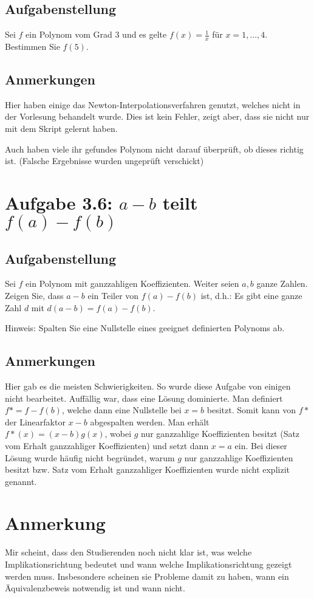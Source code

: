 \documentclass[a4paper]{article}
\begin{document}
\subsection{Aufgabenstellung}

Sei $f$ ein Polynom vom Grad 3 und es gelte $f(x)=\frac 1x$ für $x=1,\ldots,4$. Bestimmen Sie $f(5)$.

\subsection{Anmerkungen}

Hier haben einige das Newton-Interpolationsverfahren genutzt, welches nicht in der Vorlesung behandelt wurde. Dies ist kein Fehler, zeigt aber, dass sie nicht nur mit dem Skript gelernt haben.

Auch haben viele ihr gefundes Polynom nicht darauf überprüft, ob dieses richtig ist. (Falsche Ergebnisse wurden ungeprüft verschickt)

\section{Aufgabe 3.6: $a-b$ teilt $f(a)-f(b)$}

\subsection{Aufgabenstellung}

Sei $f$ ein Polynom mit ganzzahligen Koeffizienten. Weiter seien $a,b$ ganze Zahlen. Zeigen Sie, dass $a-b$ ein Teiler von $f(a)-f(b)$ ist, d.h.: Es gibt eine ganze Zahl $d$ mit $d(a-b)=f(a)-f(b)$.

Hinweis: Spalten Sie eine Nullstelle eines geeignet definierten Polynoms ab.

\subsection{Anmerkungen}

Hier gab es die meisten Schwierigkeiten. So wurde diese Aufgabe von einigen nicht bearbeitet. Auffällig war, dass eine Lösung dominierte. Man definiert $f* = f - f(b)$, welche dann eine Nullstelle bei $x=b$ besitzt. Somit kann von $f*$ der Linearfaktor $x-b$ abgespalten werden. Man erhält $f*(x) = (x-b) g(x)$, wobei $g$ nur ganzzahlige Koeffizienten besitzt (Satz vom Erhalt ganzzahliger Koeffizienten) und setzt dann $x=a$ ein. Bei dieser Lösung wurde häufig nicht begründet, warum $g$ nur ganzzahlige Koeffizienten besitzt bzw. Satz vom Erhalt ganzzahliger Koeffizienten wurde nicht explizit genannt.

\section{Anmerkung}

Mir scheint, dass den Studierenden noch nicht klar ist, was welche Implikationsrichtung bedeutet und wann welche Implikationsrichtung gezeigt werden muss. Insbesondere scheinen sie Probleme damit zu haben, wann ein Äquivalenzbeweis notwendig ist und wann nicht.
\end{document}
